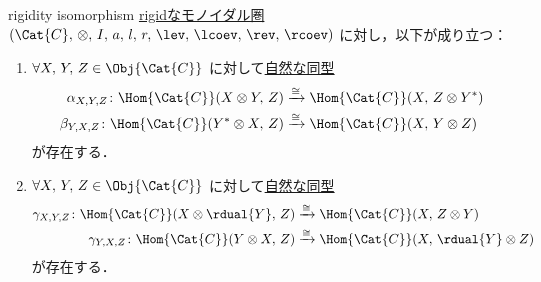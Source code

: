 \documentclass[TQFT_main]{subfiles}
\begin{document}
\begin{mylem}[label=lem:rigid-hom]{rigidity isomorphism}
    \hyperref[redef:rigid]{rigidなモノイダル圏} $(\Cat{C},\, \otimes,\, I,\, a,\, l,\, r,\, \lev,\, \lcoev,\, \rev,\, \rcoev)$ に対し，以下が成り立つ：
    \begin{enumerate}
        \item $\forall X,\, Y,\, Z \in \Obj{\Cat{C}}$ に対して\hyperref[def:nat]{自然な同型}
        \begin{align}
            \alpha_{X,Y,Z}\colon \Hom{\Cat{C}} (X \otimes Y,\, Z) &\xrightarrow{\cong} \Hom{\Cat{C}} (X,\, Z \otimes Y^*) \\
            \beta_{Y,X,Z}\colon \Hom{\Cat{C}} (Y^* \otimes X,\, Z) &\xrightarrow{\cong} \Hom{\Cat{C}} (X,\, Y \otimes Z)
        \end{align}
        が存在する．
        \item $\forall X,\, Y,\, Z \in \Obj{\Cat{C}}$ に対して\hyperref[def:nat]{自然な同型}
        \begin{align}
            \gamma_{X,Y,Z}\colon \Hom{\Cat{C}} (X \otimes \rdual{Y},\, Z) &\xrightarrow{\cong} \Hom{\Cat{C}} (X,\, Z \otimes Y) \\
            \gamma_{Y,X,Z}\colon \Hom{\Cat{C}} (Y \otimes X,\, Z) &\xrightarrow{\cong} \Hom{\Cat{C}} (X,\, \rdual{Y} \otimes Z)
        \end{align}
        が存在する．
    \end{enumerate}
    
\end{mylem}
\end{document}
